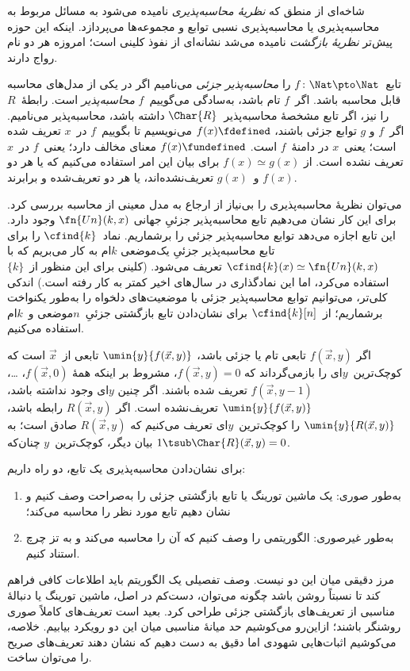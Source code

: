 \documentclass[../../../include/open-logic-section]{subfiles}
\begin{document}

شاخه‌ای از منطق که 
\emph{نظریهٔ محاسبه‌پذیری} نامیده می‌شود به مسائل مربوط به
محاسبه‌پذیری یا محاسبه‌پذیری نسبی توابع و مجموعه‌ها می‌پردازد. اینکه
این حوزه پیش‌تر 
\emph{نظریهٔ بازگشت} نامیده می‌شد نشانه‌ای از نفوذ کلینی است؛ امروزه
هر دو نام رواج دارند.

تابع~$f\colon \Nat \pto \Nat$ را 
\emph{محاسبه‌پذیر جزئی} می‌نامیم اگر در یکی از مدل‌های محاسبه قابل
محاسبه باشد. اگر~$f$ تام باشد، به‌سادگی می‌گوییم~$f$ 
\emph{محاسبه‌پذیر} است. رابطهٔ~$R$ را نیز، اگر تابع مشخصهٔ
محاسبه‌پذیر~$\Char{R}$ داشته باشد، محاسبه‌پذیر می‌نامیم. اگر~$f$ و
$g$ توابع جزئی باشند، $f(x) \fdefined$ می‌نویسیم تا بگوییم~$f$ در~$x$
تعریف شده است؛ یعنی~$x$ در دامنهٔ~$f$ است. $f(x) \fundefined$ معنای
مخالف دارد؛ یعنی~$f$ در~$x$ تعریف نشده است. از
$f(x) \simeq g(x)$ برای بیان این امر استفاده می‌کنیم که یا هر دو
$f(x)$ و~$g(x)$ تعریف‌نشده‌اند، یا هر دو تعریف‌شده و برابرند.

می‌توان نظریهٔ محاسبه‌پذیری را بی‌نیاز از ارجاع به مدل معینی از محاسبه
بررسی کرد. برای این کار نشان می‌دهیم تابع محاسبه‌پذیر جزئیِ جهانی
$\fn{Un}(k,x)$ وجود دارد. این تابع اجازه می‌دهد توابع محاسبه‌پذیر جزئی
را برشماریم. نماد~$\cfind{k}$ را برای تابع محاسبه‌پذیر جزئیِ یک‌موضعی
$k$ام به کار می‌بریم که با
$\cfind{k}(x) \simeq \fn{Un}(k,x)$ تعریف می‌شود. (کلینی برای این
منظور از~$\{k\}$ استفاده می‌کرد، اما این نمادگذاری در سال‌های اخیر
کمتر به کار رفته است.) اندکی کلی‌تر، می‌توانیم توابع محاسبه‌پذیر جزئی
با موضعیت‌های دلخواه را به‌طور یکنواخت برشماریم؛ از~$\cfind{k}[n]$
برای نشان‌دادن تابع بازگشتی جزئیِ~$n$موضعی و~$k$ام استفاده می‌کنیم.

اگر $f(\vec x,y)$ تابعی تام یا جزئی باشد،
$\umin{y}{f(\vec x,y)}$ تابعی از~$\vec x$ است که کوچک‌ترین~$y$ای را
بازمی‌گرداند که $f(\vec x,y)=0$، مشروط بر اینکه همهٔ
$f(\vec x,0)$، \dots، $f(\vec x,y-1)$ تعریف شده باشند. اگر چنین
$y$ای وجود نداشته باشد، $\umin{y}{f(\vec x,y)}$ تعریف‌نشده است. اگر
$R(\vec x,y)$ رابطه باشد، $\umin{y}{R(\vec x,y)}$ را کوچک‌ترین~$y$ای
تعریف می‌کنیم که $R(\vec x,y)$ صادق است؛ به بیان دیگر، کوچک‌ترین~$y$
چنان‌که $1 \tsub \Char{R}(\vec x,y)=0$.

برای نشان‌دادن محاسبه‌پذیری یک تابع، دو راه داریم:
\begin{enumerate}
\item به‌طور صوری: یک ماشین تورینگ یا تابع بازگشتی جزئی را به‌صراحت
  وصف کنیم و نشان دهیم تابع مورد نظر را محاسبه می‌کند؛
\item به‌طور غیرصوری: الگوریتمی را وصف کنیم که آن را محاسبه می‌کند و
  به تز چرچ استناد کنیم.
\end{enumerate}
مرز دقیقی میان این دو نیست. وصف تفصیلی یک الگوریتم باید اطلاعات کافی
فراهم کند تا نسبتاً روشن باشد چگونه می‌توان، دست‌کم در اصل، ماشین
تورینگ یا دنبالهٔ مناسبی از تعریف‌های بازگشتی جزئی طراحی کرد. بعید است
تعریف‌های کاملاً صوری روشنگر باشند؛ ازاین‌رو می‌کوشیم حد میانهٔ مناسبی
میان این دو رویکرد بیابیم. خلاصه، می‌کوشیم اثبات‌هایی شهودی اما دقیق
به دست دهیم که نشان دهند تعریف‌های صریح را می‌توان ساخت.
\end{document}
